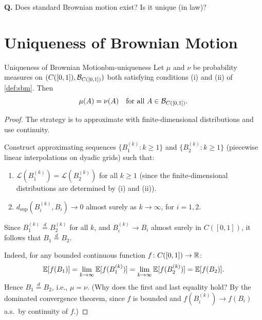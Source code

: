 \textbf{Q.} Does standard Brownian motion exist? Is it unique (in law)?

\section{Uniqueness of Brownian Motion}

\begin{theorem}{Uniqueness of Brownian Motion}{bm-uniqueness}
    Let $\mu$ and $\nu$ be probability measures on $(C([0,1]), \mathcal{B}_{C([0,1])})$ both satisfying conditions (i) and (ii) of \cref{def:sbm}. Then
    \[
        \mu(A) = \nu(A) \quad \text{for all } A \in \mathcal{B}_{C([0,1])}.
    \]
\end{theorem}

\begin{proof}
    The strategy is to approximate with finite-dimensional distributions and use continuity.

    Construct approximating sequences $\{B_1^{(k)} : k \geq 1\}$ and $\{B_2^{(k)} : k \geq 1\}$ (piecewise linear interpolations on dyadic grids) such that:
    \begin{enumerate}[label=(\alph*)]
        \item $\mathcal{L}(B_1^{(k)}) = \mathcal{L}(B_2^{(k)})$ for all $k \geq 1$ (since the finite-dimensional distributions are determined by (i) and (ii)).
        \item $d_{\sup}(B_i^{(k)}, B_i) \to 0$ almost surely as $k \to \infty$, for $i = 1, 2$.
    \end{enumerate}

    Since $B_1^{(k)} \stackrel{d}{=} B_2^{(k)}$ for all $k$, and $B_i^{(k)} \to B_i$ almost surely in $C([0,1])$, it follows that $B_1 \stackrel{d}{=} B_2$.

    Indeed, for any bounded continuous function $f \colon C([0,1]) \to \mathbb{R}$:
    \[
        \mathbb{E}[f(B_1)] = \lim_{k \to \infty} \mathbb{E}[f(B_1^{(k)})] = \lim_{k \to \infty} \mathbb{E}[f(B_2^{(k)})] = \mathbb{E}[f(B_2)].
    \]
    Hence $B_1 \stackrel{d}{=} B_2$, i.e., $\mu = \nu$. (Why does the first and last equality hold? By the dominated convergence theorem, since $f$ is bounded and $f(B_i^{(k)}) \to f(B_i)$ a.s.\ by continuity of $f$.)
\end{proof}
